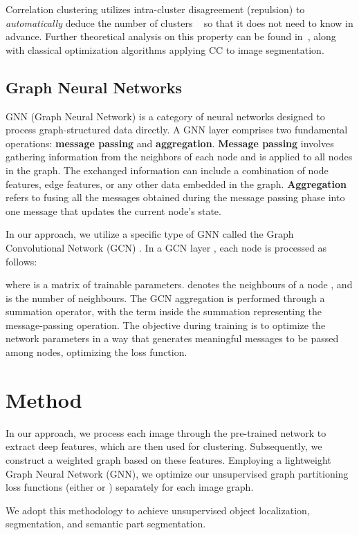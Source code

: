 \documentclass[10pt,twocolumn,letterpaper]{article}
\begin{document}
Correlation clustering utilizes intra-cluster disagreement (repulsion) to \emph{automatically} deduce the number of clusters ~\cite{bansal2004correlation}  so that it does not need to know  in advance. Further theoretical analysis on this property can be found in~\cite{bagon2011large}, along with classical optimization algorithms applying CC to image segmentation.


\subsection{Graph Neural Networks}
GNN (Graph Neural Network) is a category of neural networks designed to process graph-structured data directly. A GNN layer comprises two fundamental operations: \textbf{message passing} and \textbf{aggregation}.
\textbf{Message passing} involves gathering information from the neighbors of each node and is applied to all nodes in the graph. The exchanged information can include a combination of node features, edge features, or any other data embedded in the graph.
\textbf{Aggregation} refers to fusing all the messages obtained during the message passing phase into one message that updates the current node's state.

In our approach, we utilize a specific type of GNN called the Graph Convolutional Network (GCN) \cite{kipf2016semi}. In a GCN layer , each node  is processed as follows:

 where  is a matrix of trainable parameters.  denotes the neighbours of a node , and  is the number of neighbours. The GCN aggregation is performed through a summation operator, with the term inside the summation representing the message-passing operation. The objective during training is to optimize the network parameters  in a way that generates meaningful messages to be passed among nodes, optimizing the loss function.

\section{Method}\label{sec:method}
In our approach, we process each image through the pre-trained network to extract deep features, which are then used for clustering. Subsequently, we construct a weighted graph based on these features. Employing a lightweight Graph Neural Network (GNN), we optimize our unsupervised graph partitioning loss functions (either  or ) separately for each image graph.

We adopt this methodology to achieve unsupervised object localization, segmentation, and semantic part segmentation.
  
\end{document}
